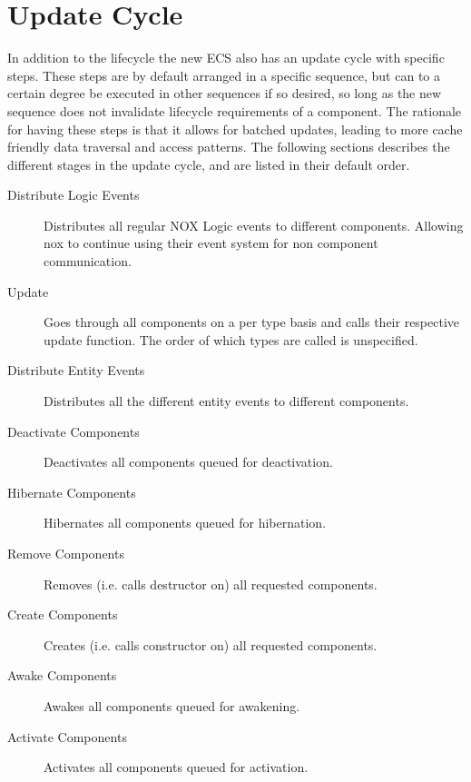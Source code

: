 \section{Update Cycle}
\label{subsec:high_level_update_cycle}
In addition to the lifecycle the new ECS also has an update cycle with specific steps.
These steps are by default arranged in a specific sequence, but can to a certain degree
be executed in other sequences if so desired,
so long as the new sequence does not invalidate lifecycle requirements of a component.
The rationale for having these steps is that it allows for batched updates,
leading to more cache friendly data traversal and access patterns.
The following sections describes the different stages in the update cycle,
and are listed in their default order.

\begin{description}
    \item
    [Distribute Logic Events]
    Distributes all regular NOX Logic events to different components.
    Allowing nox to continue using their event system for non component communication.

    \item
    [Update]
    Goes through all components on a per type basis and calls their respective update function.
    The order of which types are called is unspecified.

    \item
    [Distribute Entity Events]
    Distributes all the different entity events to different components.

    \item
    [Deactivate Components]
    Deactivates all components queued for deactivation.

    \item
    [Hibernate Components]
    Hibernates all components queued for hibernation.

    \item
    [Remove Components]
    Removes (i.e. calls destructor on) all requested components.

    \item
    [Create Components]
    Creates (i.e. calls constructor on) all requested components.

    \item
    [Awake Components]
    Awakes all components queued for awakening.

    \item
    [Activate Components]
    Activates all components queued for activation.
\end{description}
